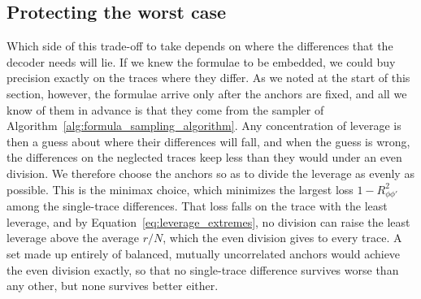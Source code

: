 \documentclass[titlepage,a4paper,11pt]{report}
\begin{document}
    \subsection{Protecting the worst case}\label{sec:protecting_the_worst_case}
    Which side of this trade-off to take depends on where the differences that the decoder needs will lie. If we knew the formulae to be embedded, we could buy precision exactly on the traces where they differ. As we noted at the start of this section, however, the formulae arrive only after the anchors are fixed, and all we know of them in advance is that they come from the sampler of Algorithm~\ref{alg:formula_sampling_algorithm}. Any concentration of leverage is then a guess about where their differences will fall, and when the guess is wrong, the differences on the neglected traces keep less than they would under an even division. We therefore choose the anchors so as to divide the leverage as evenly as possible. This is the minimax choice, which minimizes the largest loss $1-R^2_{\phi\phi'}$ among the single-trace differences. That loss falls on the trace with the least leverage, and by Equation~\eqref{eq:leverage_extremes}, no division can raise the least leverage above the average $r/N$, which the even division gives to every trace. A set made up entirely of balanced, mutually uncorrelated anchors would achieve the even division exactly, so that no single-trace difference survives worse than any other, but none survives better either.
\end{document}
